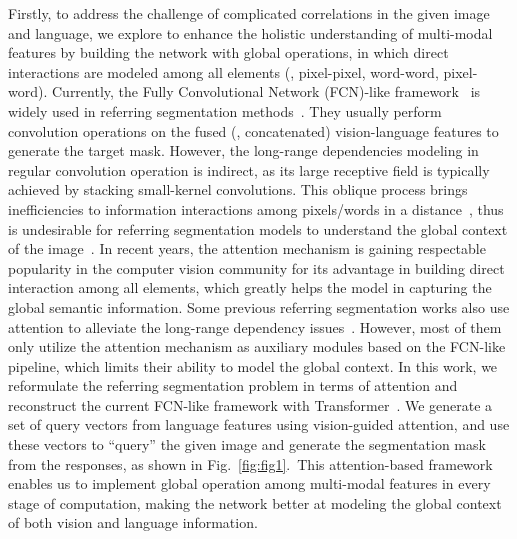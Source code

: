 \documentclass[10pt,twocolumn,letterpaper]{article}
\begin{document}
Firstly, to address the challenge of complicated correlations in the given image and language, 
we explore to enhance the holistic understanding of multi-modal features by building the network with global operations, in which direct interactions are modeled among all elements (\eg, pixel-pixel, word-word, pixel-word). Currently, the Fully Convolutional Network (FCN)-like framework~\cite{long2015fully, ding2018context, ding2019semantic, ding2019boundary} is widely used in referring segmentation methods~\cite{hu2016segmentation,margffoy2018dynamic}. They usually perform convolution operations on the fused (\eg, concatenated) vision-language features to generate the target mask. However, the long-range dependencies modeling in regular convolution operation is indirect, as its large receptive field is typically achieved by stacking small-kernel convolutions. This oblique process brings inefficiencies to information interactions among pixels/words in a distance~\cite{wang2018non}, thus is undesirable for referring segmentation models to understand the global context of the image~\cite{ye2019cross}. In recent years, the attention mechanism is gaining respectable popularity in the computer vision community for its advantage in building direct interaction among all elements, which greatly helps the model in capturing the global semantic information. Some previous referring segmentation works also use attention to alleviate the long-range dependency issues~\cite{ye2019cross,hu2020bi,shi2018key}. However, most of them only utilize the attention mechanism as auxiliary modules based on the FCN-like pipeline, which limits their ability to model the global context. In this work, we reformulate the referring segmentation problem in terms of attention and reconstruct the current FCN-like framework with Transformer~\cite{vaswani2017attention}. We generate a set of query vectors from language features using vision-guided attention, and use these vectors to ``query'' the given image and generate the segmentation mask from the responses, as shown in Fig.~\ref{fig:fig1}.~This attention-based framework enables us to implement global operation among multi-modal features in every stage of computation, making the network better at modeling the global context of both vision and language information.
\end{document}

